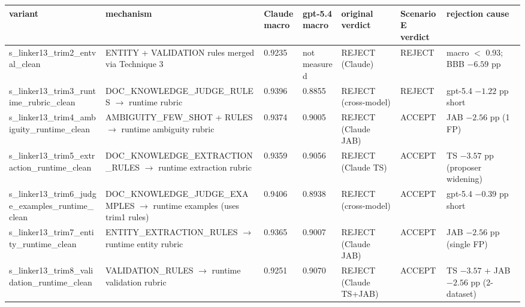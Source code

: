\vspace{0.75em}
\begin{tabular}{lllllll}
\toprule
 variant                                                & mechanism                                                                                 & Claude macro & gpt-5.4 macro & original verdict        & Scenario E verdict & rejection cause                          \\
\midrule
 s\_linker13\_trim2\_entval\_clean                      & ENTITY + VALIDATION rules merged via Technique 3                                          & 0.9235       & not measured  & REJECT (Claude)         & REJECT             & macro $<$ 0.93; BBB $-6.59$ pp           \\
 s\_linker13\_trim3\_runtime\_rubric\_clean             & DOC\_KNOWLEDGE\_JUDGE\_RULES $\to$ runtime rubric                                          & 0.9396       & 0.8855        & REJECT (cross-model)    & REJECT             & gpt-5.4 $-1.22$ pp short                 \\
 s\_linker13\_trim4\_ambiguity\_runtime\_clean          & AMBIGUITY\_FEW\_SHOT + RULES $\to$ runtime ambiguity rubric                                & 0.9374       & 0.9005        & REJECT (Claude JAB)     & ACCEPT             & JAB $-2.56$ pp (1 FP)                    \\
 s\_linker13\_trim5\_extraction\_runtime\_clean         & DOC\_KNOWLEDGE\_EXTRACTION\_RULES $\to$ runtime extraction rubric                          & 0.9359       & 0.9056        & REJECT (Claude TS)      & ACCEPT             & TS $-3.57$ pp (proposer widening)        \\
 s\_linker13\_trim6\_judge\_examples\_runtime\_clean    & DOC\_KNOWLEDGE\_JUDGE\_EXAMPLES $\to$ runtime examples (uses trim1 rules)                  & 0.9406       & 0.8938        & REJECT (cross-model)    & ACCEPT             & gpt-5.4 $-0.39$ pp short                 \\
 s\_linker13\_trim7\_entity\_runtime\_clean             & ENTITY\_EXTRACTION\_RULES $\to$ runtime entity rubric                                      & 0.9365       & 0.9007        & REJECT (Claude JAB)     & ACCEPT             & JAB $-2.56$ pp (single FP)               \\
 s\_linker13\_trim8\_validation\_runtime\_clean         & VALIDATION\_RULES $\to$ runtime validation rubric                                          & 0.9251       & 0.9070        & REJECT (Claude TS+JAB)  & ACCEPT             & TS $-3.57$ + JAB $-2.56$ pp (2-dataset)  \\
\bottomrule
\end{tabular}
